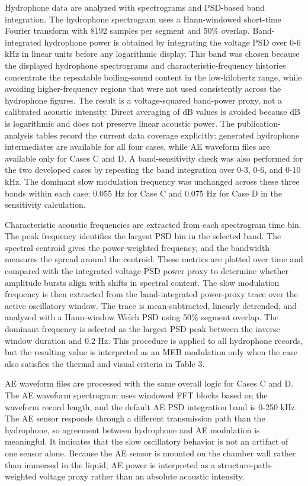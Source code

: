 \documentclass[final,1p,times]{elsarticle}
\begin{document}
Hydrophone data are analyzed with spectrograms and PSD-based band integration. The hydrophone spectrogram uses a Hann-windowed short-time Fourier transform with 8192 samples per segment and 50\% overlap. Band-integrated hydrophone power is obtained by integrating the voltage PSD over 0-6 kHz in linear units before any logarithmic display. This band was chosen because the displayed hydrophone spectrograms and characteristic-frequency histories concentrate the repeatable boiling-sound content in the low-kilohertz range, while avoiding higher-frequency regions that were not used consistently across the hydrophone figures. The result is a voltage-squared band-power proxy, not a calibrated acoustic intensity. Direct averaging of dB values is avoided because dB is logarithmic and does not preserve linear acoustic power. The publication-analysis tables record the current data coverage explicitly: generated hydrophone intermediates are available for all four cases, while AE waveform files are available only for Cases C and D. A band-sensitivity check was also performed for the two developed cases by repeating the band integration over 0-3, 0-6, and 0-10 kHz. The dominant slow modulation frequency was unchanged across these three bands within each case: 0.055 Hz for Case C and 0.075 Hz for Case D in the sensitivity calculation.

Characteristic acoustic frequencies are extracted from each spectrogram time bin. The peak frequency identifies the largest PSD bin in the selected band. The spectral centroid gives the power-weighted frequency, and the bandwidth measures the spread around the centroid. These metrics are plotted over time and compared with the integrated voltage-PSD power proxy to determine whether amplitude bursts align with shifts in spectral content. The slow modulation frequency is then extracted from the band-integrated power-proxy trace over the active oscillatory window. The trace is mean-subtracted, linearly detrended, and analyzed with a Hann-window Welch PSD using 50\% segment overlap. The dominant frequency is selected as the largest PSD peak between the inverse window duration and 0.2 Hz. This procedure is applied to all hydrophone records, but the resulting value is interpreted as an MEB modulation only when the case also satisfies the thermal and visual criteria in Table 3.

AE waveform files are processed with the same overall logic for Cases C and D. The AE waveform spectrogram uses windowed FFT blocks based on the waveform record length, and the default AE PSD integration band is 0-250 kHz. The AE sensor responds through a different transmission path than the hydrophone, so agreement between hydrophone and AE modulation is meaningful. It indicates that the slow oscillatory behavior is not an artifact of one sensor alone. Because the AE sensor is mounted on the chamber wall rather than immersed in the liquid, AE power is interpreted as a structure-path-weighted voltage proxy rather than an absolute acoustic intensity.
\end{document}
